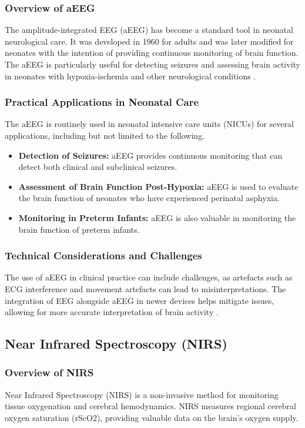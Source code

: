 \documentclass[12pt,journal,compsoc]{IEEEtran}
\begin{document}
\subsubsection{Overview of aEEG}
The amplitude-integrated EEG (aEEG) has become a standard tool in neonatal neurological care. It was developed in 1960 for adults and was later modified for neonates with the intention of providing continuous monitoring of brain function. The aEEG is particularly useful for detecting seizures and assessing brain activity in neonates with hypoxia-ischemia and other neurological conditions \cite{IEEEhowto:toet}.

\subsubsection{Practical Applications in Neonatal Care}
The aEEG is routinely used in neonatal intensive care units (NICUs) for several applications, including but not limited to the following. 

\begin{itemize}
    \item \textbf{Detection of Seizures:} aEEG provides continuous monitoring that can detect both clinical and subclinical seizures.  
    \item \textbf{Assessment of Brain Function Post-Hypoxia:} aEEG is used to evaluate the brain function of neonates who have experienced perinatal asphyxia.  
    \item \textbf{Monitoring in Preterm Infants:} aEEG is also valuable in monitoring the brain function of preterm infants.  
\end{itemize}

\subsubsection{Technical Considerations and Challenges}
The use of aEEG in clinical practice can include challenges, as artefacts such as ECG interference and movement artefacts can lead to misinterpretations. The integration of EEG alongside aEEG in newer devices helps mitigate issues, allowing for more accurate interpretation of brain activity \cite{IEEEhowto:toet}.

\subsection{Near Infrared Spectroscopy (NIRS)}

\subsubsection{Overview of NIRS}
Near Infrared Spectroscopy (NIRS) is a non-invasive method for monitoring tissue oxygenation and cerebral hemodynamics. NIRS measures regional cerebral oxygen saturation (rScO2), providing valuable data on the brain's oxygen supply. 
\end{document}
